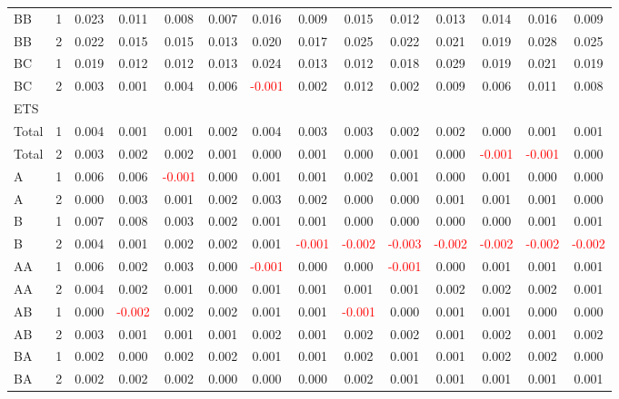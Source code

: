 \begin{table}
{\begin{tabular}{llcccccccccccc}
BB & 1 & 0.023 & 0.011 & 0.008 & 0.007 & 0.016 & 0.009 & 0.015 & 0.012 & 0.013 & 0.014 & 0.016 & 0.009\\
BB & 2 & 0.022 & 0.015 & 0.015 & 0.013 & 0.020 & 0.017 & 0.025 & 0.022 & 0.021 & 0.019 & 0.028 & 0.025\\
BC & 1 & 0.019 & 0.012 & 0.012 & 0.013 & 0.024 & 0.013 & 0.012 & 0.018 & 0.029 & 0.019 & 0.021 & 0.019\\
BC & 2 & 0.003 & 0.001 & 0.004 & 0.006 & \textcolor{red}{-0.001} & 0.002 & 0.012 & 0.002 & 0.009 & 0.006 & 0.011 & 0.008\\
\hline
ETS &  &  &  &  &  &  &  &  &  &  &  &  & \\
\hline
Total & 1 & 0.004 & 0.001 & 0.001 & 0.002 & 0.004 & 0.003 & 0.003 & 0.002 & 0.002 & 0.000 & 0.001 & 0.001\\
Total & 2 & 0.003 & 0.002 & 0.002 & 0.001 & 0.000 & 0.001 & 0.000 & 0.001 & 0.000 & \textcolor{red}{-0.001} & \textcolor{red}{-0.001} & 0.000\\
A & 1 & 0.006 & 0.006 & \textcolor{red}{-0.001} & 0.000 & 0.001 & 0.001 & 0.002 & 0.001 & 0.000 & 0.001 & 0.000 & 0.000\\
A & 2 & 0.000 & 0.003 & 0.001 & 0.002 & 0.003 & 0.002 & 0.000 & 0.000 & 0.001 & 0.001 & 0.001 & 0.000\\
B & 1 & 0.007 & 0.008 & 0.003 & 0.002 & 0.001 & 0.001 & 0.000 & 0.000 & 0.000 & 0.000 & 0.001 & 0.001\\
B & 2 & 0.004 & 0.001 & 0.002 & 0.002 & 0.001 & \textcolor{red}{-0.001} & \textcolor{red}{-0.002} & \textcolor{red}{-0.003} & \textcolor{red}{-0.002} & \textcolor{red}{-0.002} & \textcolor{red}{-0.002} & \textcolor{red}{-0.002}\\
AA & 1 & 0.006 & 0.002 & 0.003 & 0.000 & \textcolor{red}{-0.001} & 0.000 & 0.000 & \textcolor{red}{-0.001} & 0.000 & 0.001 & 0.001 & 0.001\\
AA & 2 & 0.004 & 0.002 & 0.001 & 0.000 & 0.001 & 0.001 & 0.001 & 0.001 & 0.002 & 0.002 & 0.002 & 0.001\\
AB & 1 & 0.000 & \textcolor{red}{-0.002} & 0.002 & 0.002 & 0.001 & 0.001 & \textcolor{red}{-0.001} & 0.000 & 0.001 & 0.001 & 0.000 & 0.000\\
AB & 2 & 0.003 & 0.001 & 0.001 & 0.001 & 0.002 & 0.001 & 0.002 & 0.002 & 0.001 & 0.002 & 0.001 & 0.002\\
BA & 1 & 0.002 & 0.000 & 0.002 & 0.002 & 0.001 & 0.001 & 0.002 & 0.001 & 0.001 & 0.002 & 0.002 & 0.000\\
BA & 2 & 0.002 & 0.002 & 0.002 & 0.000 & 0.000 & 0.000 & 0.002 & 0.001 & 0.001 & 0.001 & 0.001 & 0.001\\

\end{tabular}}
\end{table}
